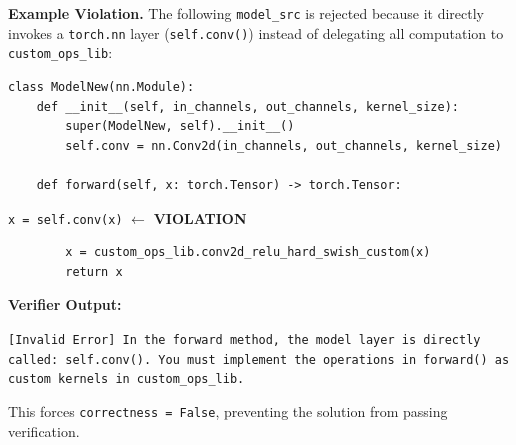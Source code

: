 \documentclass{article} %
\theoremstyle{definition}
\theoremstyle{remark}
\begin{document}
  \textbf{Example Violation.}
  The following \texttt{model\_src} is rejected because it directly invokes a \texttt{torch.nn} layer (\colorbox{red!20}{\texttt{self.conv()}}) instead of delegating all computation to \texttt{custom\_ops\_lib}:

  \begin{tcolorbox}[colback=gray!5, colframe=red!50, boxrule=0.5pt, arc=2pt, title={Rejected \texttt{model\_src} -- Hacking Detected}, fonttitle=\bfseries\small, breakable, nobeforeafter]
  \begin{verbatim}
class ModelNew(nn.Module):
    def __init__(self, in_channels, out_channels, kernel_size):
        super(ModelNew, self).__init__()
        self.conv = nn.Conv2d(in_channels, out_channels, kernel_size)

    def forward(self, x: torch.Tensor) -> torch.Tensor:
  \end{verbatim}
  \vspace{-1.5em}
  \hspace{4.5em}\colorbox{red!20}{\texttt{x = self.conv(x)}}  \hfill $\leftarrow$ \textbf{VIOLATION}
  \begin{verbatim}
        x = custom_ops_lib.conv2d_relu_hard_swish_custom(x)
        return x
  \end{verbatim}
  \end{tcolorbox}

  \noindent\textbf{Verifier Output:}
  \begin{tcolorbox}[colback=yellow!8, colframe=yellow!50, boxrule=0.3pt, arc=2pt, left=3pt, right=3pt, top=2pt, bottom=2pt]
  \small\texttt{[Invalid Error] In the forward method, the model layer is directly called: self.conv(). You must implement the operations in forward() as custom kernels in custom\_ops\_lib.}
  \end{tcolorbox}
  \noindent This forces \texttt{correctness = False}, preventing the solution from passing verification.
\end{document}

